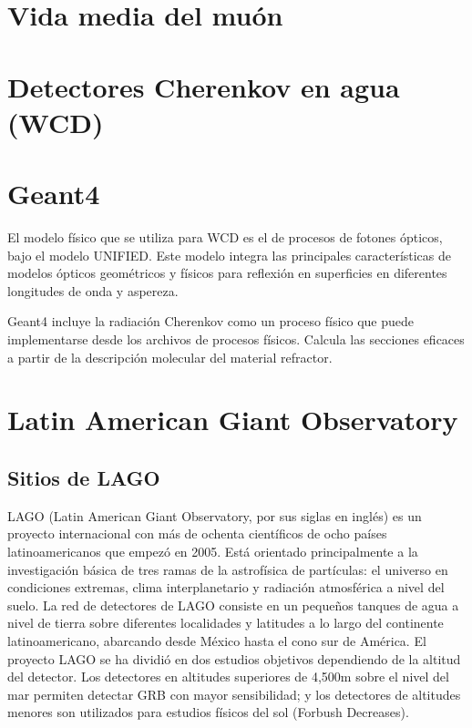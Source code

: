 \documentclass{book}
\begin{document}
\section{Vida media del mu\'on}

\section{Detectores Cherenkov en agua (WCD)}

\section{Geant4}

El modelo f\'isico que se utiliza para WCD es el de procesos de fotones \'opticos, bajo el modelo UNIFIED. Este modelo integra las principales caracter\'isticas de modelos \'opticos geom\'etricos y f\'isicos para reflexi\'on en superficies en diferentes longitudes de onda y aspereza.

Geant4 incluye la radiaci\'on Cherenkov como un proceso f\'isico que puede implementarse desde los archivos de procesos f\'isicos. Calcula las secciones eficaces a partir de la descripci\'on molecular del material refractor. 



\section{Latin American Giant Observatory}
\subsection{Sitios de LAGO}
LAGO (Latin American Giant Observatory, por sus siglas en ingl\'es) es un proyecto internacional con m\'as de ochenta cient\'ificos de ocho pa\'ises latinoamericanos que empez\'o en 2005. Est\'a orientado principalmente a la investigaci\'on b\'asica de tres ramas de la astrof\'isica de part\'iculas: el universo en condiciones extremas, clima interplanetario y radiaci\'on atmosf\'erica a nivel del suelo. La red de detectores de LAGO consiste en un peque\~nos tanques de agua a nivel de tierra sobre diferentes localidades y latitudes a lo largo del continente latinoamericano, abarcando desde M\'exico hasta el cono sur de Am\'erica. El proyecto LAGO se ha dividi\'o en dos estudios objetivos dependiendo de la altitud del detector. Los detectores en altitudes superiores de 4,500m sobre el nivel del mar permiten detectar GRB con mayor sensibilidad; y los detectores de altitudes menores son utilizados para estudios f\'isicos del sol (Forbush Decreases). \citep{ASOREY2015}
\end{document}
